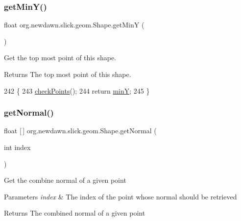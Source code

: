 \subsubsection{\texorpdfstring{get\+Min\+Y()}{getMinY()}}
{\footnotesize\ttfamily float org.\+newdawn.\+slick.\+geom.\+Shape.\+get\+MinY (\begin{DoxyParamCaption}{ }\end{DoxyParamCaption})\hspace{0.3cm}{\ttfamily [inline]}}

Get the top most point of this shape.

\begin{DoxyReturn}{Returns}
The top most point of this shape. 
\end{DoxyReturn}

\begin{DoxyCode}
242                            \{
243         \mbox{\hyperlink{classorg_1_1newdawn_1_1slick_1_1geom_1_1_shape_a84293802d05e8666a441720bfc12745d}{checkPoints}}();
244         \textcolor{keywordflow}{return} \mbox{\hyperlink{classorg_1_1newdawn_1_1slick_1_1geom_1_1_shape_a4794592d5238a8c51d9d8ac4a11e68d4}{minY}};
245     \}
\end{DoxyCode}
\mbox{\label{classorg_1_1newdawn_1_1slick_1_1geom_1_1_shape_a18b7f386a5e576dceefaa36d7858713f}} 
\subsubsection{\texorpdfstring{get\+Normal()}{getNormal()}\hspace{0.1cm}{\footnotesize\ttfamily [1/2]}}
{\footnotesize\ttfamily float \mbox{[}$\,$\mbox{]} org.\+newdawn.\+slick.\+geom.\+Shape.\+get\+Normal (\begin{DoxyParamCaption}\item[{int}]{index }\end{DoxyParamCaption})\hspace{0.3cm}{\ttfamily [inline]}}

Get the combine normal of a given point


\begin{DoxyParams}{Parameters}
{\em index} & The index of the point whose normal should be retrieved \\
\hline
\end{DoxyParams}
\begin{DoxyReturn}{Returns}
The combined normal of a given point 
\end{DoxyReturn}

